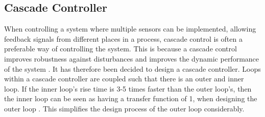 \subsection{Cascade Controller}
When controlling a system where multiple sensors can be implemented, allowing feedback signals from different places in a process, cascade control is often a preferable way of controlling the system. This is because a cascade control improves robustness against disturbances and improves the dynamic performance of the system \citep{sou:cascade_controller}. It has therefore been decided to design a cascade controller. Loops within a cascade controller are coupled such that there is an outer and inner loop. If the inner loop's rise time is 3-5 times faster than the outer loop's, then the inner loop can be seen as having a transfer function of 1, when designing the outer loop \citep{sou:control_slide13}. This simplifies the design process of the outer loop considerably. %
